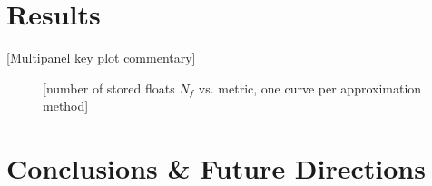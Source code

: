 \documentclass[\docopts]{\docclass}
\begin{document}


\section{Results}
\label{sec:results}

%

[Multipanel key plot commentary]

\begin{figure}
\caption{[number of stored floats $N_{f}$ vs. metric, one curve per approximation method]\label{fig:results}}
\end{figure}


%



\section{Conclusions \& Future Directions}
\label{sec:conclusions}

%
%
\end{document}
